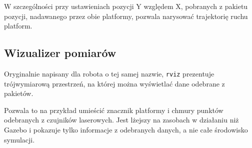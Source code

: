 		W szczególności przy ustawieniach pozycji Y względem X, pobranych z pakietu pozycji, nadawanego przez obie platformy, pozwala narysować trajektorię ruchu platform.
	\subsection{Wizualizer pomiarów}
		Oryginalnie napisany dla robota o tej samej nazwie, \texttt{rviz} prezentuje trójwymiarową przestrzeń, na której można wyświetlać 
		dane odebrane z pakietów.
		
		Pozwala to na przykład umieścić znacznik platformy i chmury punktów odebranych z czujników laserowych.
		Jest lżejszy na zasobach w działaniu niż Gazebo i pokazuje tylko informacje z odebranych danych, a nie całe środowisko symulacji.
		
		
	
	
	
	
	


